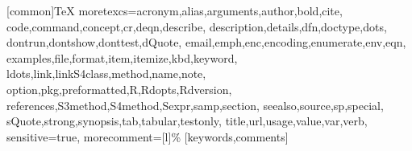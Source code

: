 \RequirePackage{fancyvrb}
\RequirePackage{listings}
%
\RequirePackage{color}
[common]{TeX}%
{moretexcs={acronym,alias,arguments,author,bold,cite,%
          code,command,concept,cr,deqn,describe,%
          description,details,dfn,doctype,dots,%
          dontrun,dontshow,donttest,dQuote,%
          email,emph,enc,encoding,enumerate,env,eqn,%
          examples,file,format,item,itemize,kbd,keyword,%
          ldots,link,linkS4class,method,name,note,%
          option,pkg,preformatted,R,Rdopts,Rdversion,%
          references,S3method,S4method,Sexpr,samp,section,%
          seealso,source,sp,special,%
          sQuote,strong,synopsis,tab,tabular,testonly,%
          title,url,usage,value,var,verb},
   sensitive=true,%
   morecomment=[l]\%%
}[keywords,comments]%
%
%
\global\def\Rlstset{\lstset{style=Rstyle}}%
\global\def\Rdlstset{\lstset{style=Rdstyle}}%
